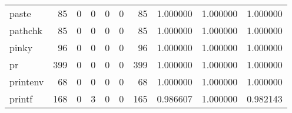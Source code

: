\begin{longtable}{lrrrrrrrrr}
paste     &                                    85 &                                                  0 &                                                  0 &                                                  0 &                                                  0 &                                                 85 &                                           1.000000 &                               1.000000 &                             1.000000 \\
pathchk   &                                    85 &                                                  0 &                                                  0 &                                                  0 &                                                  0 &                                                 85 &                                           1.000000 &                               1.000000 &                             1.000000 \\
pinky     &                                    96 &                                                  0 &                                                  0 &                                                  0 &                                                  0 &                                                 96 &                                           1.000000 &                               1.000000 &                             1.000000 \\
pr        &                                   399 &                                                  0 &                                                  0 &                                                  0 &                                                  0 &                                                399 &                                           1.000000 &                               1.000000 &                             1.000000 \\
printenv  &                                    68 &                                                  0 &                                                  0 &                                                  0 &                                                  0 &                                                 68 &                                           1.000000 &                               1.000000 &                             1.000000 \\
printf    &                                   168 &                                                  0 &                                                  3 &                                                  0 &                                                  0 &                                                165 &                                           0.986607 &                               1.000000 &                             0.982143 \\

\end{longtable}
